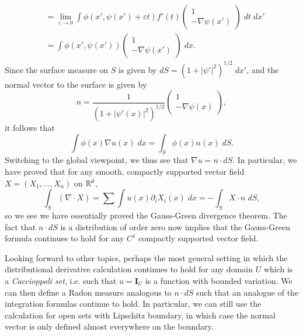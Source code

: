 \begin{example}
\begin{align*}
        &= \lim_{\varepsilon \to 0} \int \phi(x', \psi(x') + \varepsilon t) f'(t) \begin{pmatrix} 1 \\ - \nabla \psi(x') \end{pmatrix}\; dt\; dx'\\
        &= \int \phi(x', \psi(x')) \begin{pmatrix} 1 \\ -\nabla \psi(x') \end{pmatrix}\; dx.
    \end{align*}
    Since the surface measure on $S$ is given by $dS = (1 + |\psi'|^2)^{1/2}\; dx'$, and the normal vector to the surface is given by
    \[ n = \frac{1}{(1 + |\psi'(x)|^2)^{1/2}} \begin{pmatrix} 1 \\ - \nabla \psi(x) \end{pmatrix}, \]
    it follows that
    \[ \int \phi(x) \nabla u(x)\; dx = \int_S \phi(x) n(x)\; dS. \]
    Switching to the global viewpoint, we thus see that $\nabla u = n \cdot dS$. In particular, we have proved that for any smooth, compactly supported vector field $X = (X_1,\dots,X_n)$ on $\operatorname{\mathbb{R}}^d$,
    \[ \int_S (\nabla \cdot X) = \sum \int u(x) \partial_i X_i(x)\; dx = - \int_S X \cdot n\; dS, \]
    so we see we have essentially proved the Gauss-Green divergence theorem. The fact that $n \cdot dS$ is a distribution of order zero now implies that the Gauss-Green formula continues to hold for any $C^1$ compactly supported vector field.

    Looking forward to other topics, perhaps the most general setting in which the distributional derivative calculation continues to hold for any domain $U$ which is a \emph{Caccioppoli set}, i.e. such that $u = \mathbf{I}_U$ is a function with bounded variation. We can then define a Radon measure analogous to $n \cdot dS$ such that an analogue of the integration formulas continue to hold. In particular, we can still use the calculation for open sets with Lipschitz boundary, in which case the normal vector is only defined almost everywhere on the boundary.    
\end{example}

